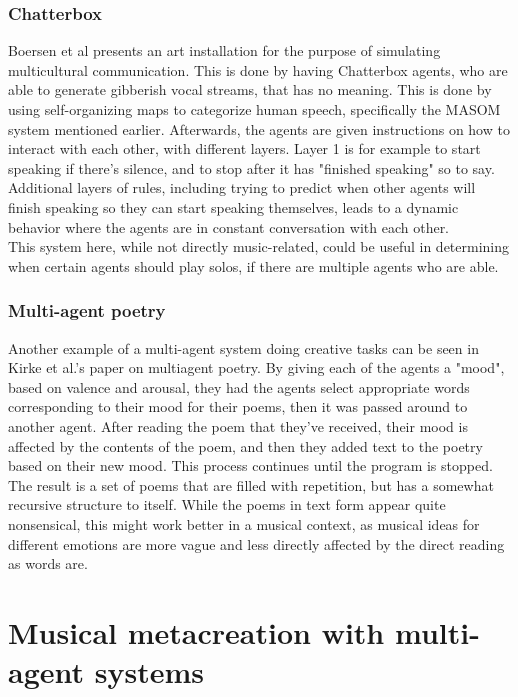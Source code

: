 \documentclass[a4paper,english]{report}
\begin{document}
	\subsubsection{Chatterbox}
	Boersen et al presents an art installation for the purpose of simulating multicultural communication. This is done by having Chatterbox agents, who are able to generate gibberish vocal streams, that has no meaning. This is done by using self-organizing maps to categorize human speech, specifically the MASOM system mentioned earlier. Afterwards, the agents are given instructions on how to interact with each other, with different layers. Layer 1 is for example to start speaking if there's silence, and to stop after it has "finished speaking" so to say. Additional layers of rules, including trying to predict when other agents will finish speaking so they can start speaking themselves, leads to a dynamic behavior where the agents are in constant conversation with each other.\\
	This system here, while not directly music-related, could be useful in determining when certain agents should play solos, if there are multiple agents who are able.
	
	\subsubsection{Multi-agent poetry}
	Another example of a multi-agent system doing creative tasks can be seen in Kirke et al.'s paper on multiagent poetry.\cite{kirke2013emotional} By giving each of the agents a "mood", based on valence and arousal, they had the agents select appropriate words corresponding to their mood for their poems, then it was passed around to another agent. After reading the poem that they've received, their mood is affected by the contents of the poem, and then they added text to the poetry based on their new mood. This process continues until the program is stopped. The result is a set of poems that are filled with repetition, but has a somewhat recursive structure  to itself. While the poems in text form appear quite nonsensical, this might work better in a musical context, as musical ideas for different emotions are more vague and less directly affected by the direct reading as words are.
	
	\section{Musical metacreation with multi-agent systems}
\end{document}
